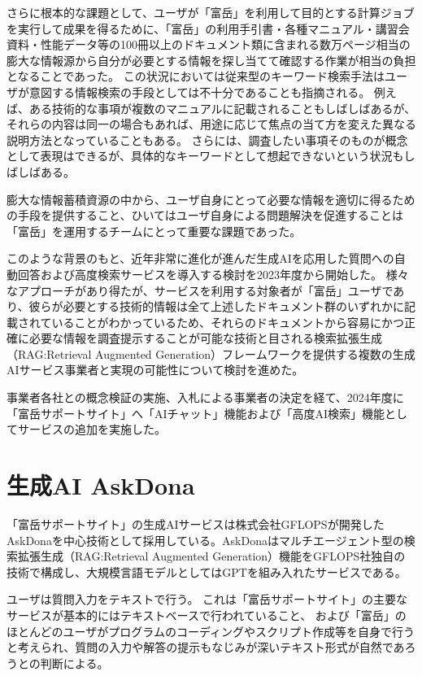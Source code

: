 \documentclass{jsaxiesproc}
\begin{document}
さらに根本的な課題として、ユーザが「富岳」を利用して目的とする計算ジョブを実行して成果を得るために、「富岳」の利用手引書・各種マニュアル・講習会資料・性能データ等の100冊以上のドキュメント類に含まれる数万ページ相当の膨大な情報源から自分が必要とする情報を探し当てて確認する作業が相当の負担となることであった。
この状況においては従来型のキーワード検索手法はユーザが意図する情報検索の手段としては不十分であることも指摘される。
例えば、ある技術的な事項が複数のマニュアルに記載されることもしばしばあるが、
それらの内容は同一の場合もあれば、用途に応じて焦点の当て方を変えた異なる説明方法となっていることもある。
さらには、調査したい事項そのものが概念として表現はできるが、具体的なキーワードとして想起できないという状況もしばしばある。

膨大な情報蓄積資源の中から、ユーザ自身にとって必要な情報を適切に得るための手段を提供すること、ひいてはユーザ自身による問題解決を促進することは「富岳」を運用するチームにとって重要な課題であった。

このような背景のもと、近年非常に進化が進んだ生成AIを応用した質問への自動回答および高度検索サービスを導入する検討を2023年度から開始した。
様々なアプローチがあり得たが、サービスを利用する対象者が「富岳」ユーザであり、彼らが必要とする技術的情報は全て上述したドキュメント群のいずれかに記載されていることがわかっているため、それらのドキュメントから容易にかつ正確に必要な情報を調査提示することが可能な技術と目される検索拡張生成（RAG:Retrieval Augmented Generation）フレームワークを提供する複数の生成AIサービス事業者と実現の可能性について検討を進めた。

事業者各社との概念検証の実施、入札による事業者の決定を経て、2024年度に「富岳サポートサイト」へ「AIチャット」機能および「高度AI検索」機能としてサービスの追加を実施した。



\section{生成AI AskDona}


「富岳サポートサイト」の生成AIサービスは株式会社GFLOPSが開発したAskDonaを中心技術として採用している。AskDonaはマルチエージェント型の検索拡張生成（RAG:Retrieval Augmented Generation）機能をGFLOPS社独自の技術で構成し、大規模言語モデルとしてはGPTを組み入れたサービスである。

ユーザは質問入力をテキストで行う。
これは「富岳サポートサイト」の主要なサービスが基本的にはテキストベースで行われていること、
および「富岳」のほとんどのユーザがプログラムのコーディングやスクリプト作成等を自身で行う
と考えられ、質問の入力や解答の提示もなじみが深いテキスト形式が自然であろうとの判断による。
\end{document}
